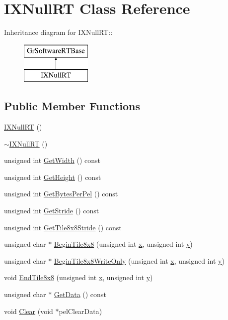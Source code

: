 \hypertarget{class_i_x_null_r_t}{
\section{IXNullRT Class Reference}
\label{class_i_x_null_r_t}
}
Inheritance diagram for IXNullRT::\begin{figure}[H]
\begin{center}
\leavevmode
\includegraphics[height=2cm]{class_i_x_null_r_t}
\end{center}
\end{figure}
\subsection*{Public Member Functions}
\begin{CompactItemize}
\item 
\hyperlink{class_i_x_null_r_t_f81867034269cacdbdde5a579b8393cd}{IXNullRT} ()
\item 
\hyperlink{class_i_x_null_r_t_0b59ee7c2ee56faff46d6f391c33e1af}{$\sim$IXNullRT} ()
\item 
unsigned int \hyperlink{class_i_x_null_r_t_f4d16738ce92117b4417835a826b88d8}{GetWidth} () const 
\item 
unsigned int \hyperlink{class_i_x_null_r_t_5b13ae270a175d81819b723ed179d509}{GetHeight} () const 
\item 
unsigned int \hyperlink{class_i_x_null_r_t_9217a8a15e5fde56c766502cdb1cdf4f}{GetBytesPerPel} () const 
\item 
unsigned int \hyperlink{class_i_x_null_r_t_222102700f00521e11cf2ae89ce3b061}{GetStride} () const 
\item 
unsigned int \hyperlink{class_i_x_null_r_t_798d86cbd68ba16bfbc2fa9b8cdbde1c}{GetTile8x8Stride} () const 
\item 
unsigned char $\ast$ \hyperlink{class_i_x_null_r_t_ea6bb9f8e61bf8a53deab237d6c93fd2}{BeginTile8x8} (unsigned int \hyperlink{wglext_8h_d77deca22f617d3f0e0eb786445689fc}{x}, unsigned int \hyperlink{wglext_8h_9298c7ad619074f5285b32c6b72bfdea}{y})
\item 
unsigned char $\ast$ \hyperlink{class_i_x_null_r_t_2bf9c2cf6c9e67cd29739456f1bc4e11}{BeginTile8x8WriteOnly} (unsigned int \hyperlink{wglext_8h_d77deca22f617d3f0e0eb786445689fc}{x}, unsigned int \hyperlink{wglext_8h_9298c7ad619074f5285b32c6b72bfdea}{y})
\item 
void \hyperlink{class_i_x_null_r_t_483a293eb0878d94101cf84ba12632cd}{EndTile8x8} (unsigned int \hyperlink{wglext_8h_d77deca22f617d3f0e0eb786445689fc}{x}, unsigned int \hyperlink{wglext_8h_9298c7ad619074f5285b32c6b72bfdea}{y})
\item 
unsigned char $\ast$ \hyperlink{class_i_x_null_r_t_18bee9ebdc0d97a52ed54f67601e9ba4}{GetData} () const 
\item 
void \hyperlink{class_i_x_null_r_t_b52bf96df67795082011895ed5173c1b}{Clear} (void $\ast$pelClearData)
\end{CompactItemize}


